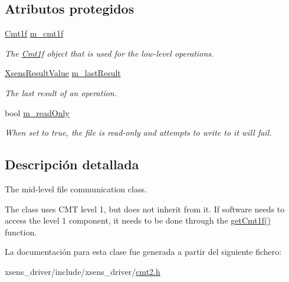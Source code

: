 \subsection*{\-Atributos protegidos}
\begin{DoxyCompactItemize}
\item 
\hypertarget{classxsens_1_1Cmt2f_a7eb9f21e2a62c7f04542314fc77e3643}{\hyperlink{classxsens_1_1Cmt1f}{\-Cmt1f} \hyperlink{classxsens_1_1Cmt2f_a7eb9f21e2a62c7f04542314fc77e3643}{m\-\_\-cmt1f}}\label{classxsens_1_1Cmt2f_a7eb9f21e2a62c7f04542314fc77e3643}

\begin{DoxyCompactList}\small\item\em \-The \hyperlink{classxsens_1_1Cmt1f}{\-Cmt1f} object that is used for the low-\/level operations. \end{DoxyCompactList}\item 
\hypertarget{classxsens_1_1Cmt2f_a3b8efc86964bf8fdfefa522d4ed276a0}{\hyperlink{group__enums_ga822a2260a20af524029eef9e9a51ff6f}{\-Xsens\-Result\-Value} \hyperlink{classxsens_1_1Cmt2f_a3b8efc86964bf8fdfefa522d4ed276a0}{m\-\_\-last\-Result}}\label{classxsens_1_1Cmt2f_a3b8efc86964bf8fdfefa522d4ed276a0}

\begin{DoxyCompactList}\small\item\em \-The last result of an operation. \end{DoxyCompactList}\item 
\hypertarget{classxsens_1_1Cmt2f_a0cd0131b94f2a3b8e60739bb06e4e2e3}{bool \hyperlink{classxsens_1_1Cmt2f_a0cd0131b94f2a3b8e60739bb06e4e2e3}{m\-\_\-read\-Only}}\label{classxsens_1_1Cmt2f_a0cd0131b94f2a3b8e60739bb06e4e2e3}

\begin{DoxyCompactList}\small\item\em \-When set to true, the file is read-\/only and attempts to write to it will fail. \end{DoxyCompactList}\end{DoxyCompactItemize}


\subsection{\-Descripción detallada}
\-The mid-\/level file communication class. 

\-The class uses \-C\-M\-T level 1, but does not inherit from it. \-If software needs to access the level 1 component, it needs to be done through the \hyperlink{classxsens_1_1Cmt2f_a9c6f527aa98b762a92867a559e2437bb}{get\-Cmt1f()} function. 

\-La documentación para esta clase fue generada a partir del siguiente fichero\-:\begin{DoxyCompactItemize}
\item 
xsens\-\_\-driver/include/xsens\-\_\-driver/\hyperlink{cmt2_8h}{cmt2.\-h}\end{DoxyCompactItemize}
